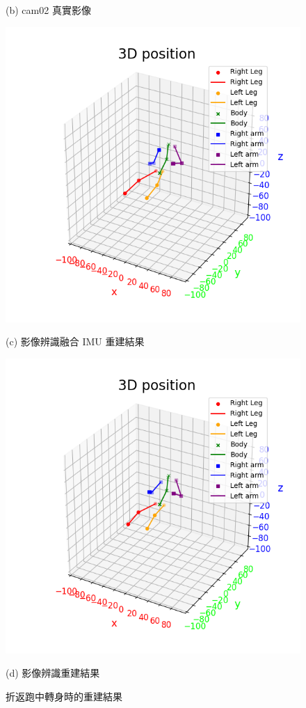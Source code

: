 \begin{figure}[!ht]
\begin{minipage}{.5\textwidth}
       \caption*{(b) cam02 真實影像}
    \end{minipage}
    \begin{minipage}{.5\textwidth}
       \centering
       \includegraphics[width=.95\linewidth]{figure/ch4_fig_run_result_with2.png}
       \caption*{(c) 影像辨識融合 IMU 重建結果}
    \end{minipage}%
    \begin{minipage}{.5\textwidth}
       \centering
       \includegraphics[width=.95\linewidth]{figure/ch4_fig_run_result_no2.png}
       \caption*{(d) 影像辨識重建結果}
    \end{minipage}
   \caption[折返跑中轉身時的重建結果]{折返跑中轉身時的重建結果}
   \label{ch4_fig_run_turn}
\end{figure}

